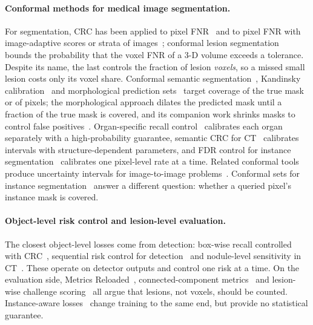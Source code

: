 \documentclass[sn-mathphys-num]{sn-jnl}%
\theoremstyle{thmstyleone}
\theoremstyle{thmstyletwo}
\theoremstyle{thmstylethree}
\newcommand{\1}{\mathbb{1}}
\begin{document}
\paragraph{Conformal methods for medical image segmentation.}
For segmentation, CRC has been applied to pixel FNR~\cite{angelopoulos2024crc} and to pixel FNR with image-adaptive scores or strata of images~\cite{luo2025ccra}; conformal lesion segmentation~\cite{tan2025cls} bounds the probability that the voxel FNR of a 3-D volume exceeds a tolerance. Despite its name, the last controls the fraction of lesion \emph{voxels}, so a missed small lesion costs only its voxel share. Conformal semantic segmentation~\cite{mossina2024semantic}, Kandinsky calibration~\cite{brunekreef2024kandinsky} and morphological prediction sets~\cite{mossina2025morph} target coverage of the true mask or of pixels; the morphological approach dilates the predicted mask until a fraction of the true mask is covered, and its companion work shrinks masks to control false positives~\cite{mossina2025fp}. Organ-specific recall control~\cite{adhikary2026perorgan} calibrates each organ separately with a high-probability guarantee, semantic CRC for CT~\cite{teneggi2025semcrc} calibrates intervals with structure-dependent parameters, and FDR control for instance segmentation~\cite{dai2025fdr} calibrates one pixel-level rate at a time. Related conformal tools produce uncertainty intervals for image-to-image problems~\cite{angelopoulos2022im2im}. Conformal sets for instance segmentation~\cite{lu2026instance} answer a different question: whether a queried pixel's instance mask is covered.

\paragraph{Object-level risk control and lesion-level evaluation.}
The closest object-level losses come from detection: box-wise recall controlled with CRC~\cite{andeol2023railway}, sequential risk control for detection~\cite{andeol2025seqcrc} and nodule-level sensitivity in CT~\cite{hulsman2025nodule}. These operate on detector outputs and control one risk at a time. On the evaluation side, Metrics Reloaded~\cite{maierhein2024metrics,reinke2024pitfalls}, connected-component metrics~\cite{jaus2025ccmetrics} and lesion-wise challenge scoring~\cite{moawad2023bratsmets} all argue that lesions, not voxels, should be counted. Instance-aware losses~\cite{kofler2023blob,bouteille2025closer} change training to the same end, but provide no statistical guarantee.
\end{document}
